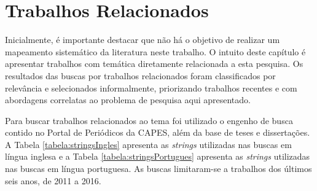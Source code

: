 \chapter{Trabalhos Relacionados}

Inicialmente, é importante destacar que não há o objetivo de realizar um mapeamento sistemático da literatura neste trabalho. O intuito deste capítulo é apresentar trabalhos com temática diretamente relacionada a esta pesquisa. Os resultados das buscas por trabalhos relacionados foram classificados por relevância e selecionados informalmente, priorizando trabalhos recentes e com abordagens correlatas ao problema de pesquisa aqui apresentado.

Para buscar trabalhos relacionados ao tema foi utilizado o engenho de busca contido no Portal de Periódicos da CAPES, além da base de teses e dissertações. A Tabela \ref{tabela:stringsIngles} apresenta as \textit{strings} utilizadas nas buscas em língua inglesa e a Tabela \ref{tabela:stringsPortugues} apresenta as \textit{strings} utilizadas nas buscas em língua portuguesa. As buscas limitaram-se a trabalhos dos últimos seis anos, de 2011 a 2016.

